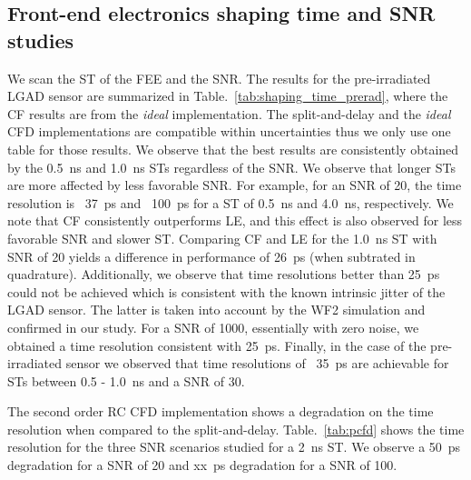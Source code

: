 \documentclass[preprint,1p]{elsarticle}
\begin{document}
\subsection{Front-end electronics shaping time and SNR studies}\label{sec:shaping_time}
We scan the ST of the FEE and the SNR. The results for the pre-irradiated LGAD sensor are summarized in Table.~\ref{tab:shaping_time_prerad},
where the CF results are from the \textit{ideal} implementation. The {\color{red} split-and-delay}
 and the \textit{ideal} CFD implementations are compatible within uncertainties thus we only use one table for those results.
 We observe that the best results are consistently obtained by the 0.5~\si{ns} and 1.0~\si{ns} STs regardless of the SNR. We observe that
 longer STs are more affected by less favorable SNR. For example, for an SNR of 20, the time resolution is ~37~\si{ps} and ~100~\si{ps} for a
ST of 0.5~\si{ns} and 4.0~\si{ns}, respectively. We note that CF consistently outperforms LE, and this effect is also observed
 for less favorable SNR and slower ST. Comparing CF and LE for the 1.0~\si{ns} ST with SNR of 20 yields a difference in performance of
 26~\si{ps} (when subtrated in quadrature). Additionally, we observe that time resolutions better than 25~\si{ps} could not be achieved which
 is consistent with the known intrinsic jitter of the LGAD sensor. The latter is taken into account by the WF2 simulation and
confirmed in our study. For a SNR of 1000, essentially with zero noise, we obtained a time resolution consistent with 25~\si{ps}.
Finally, in the case of the pre-irradiated sensor we observed that time resolutions of ~35~\si{ps} are achievable for
STs between 0.5 - 1.0~\si{ns} and a SNR of 30.

The {\color{red} second order RC} CFD implementation shows a degradation on the time resolution when compared
to the {\color{red} split-and-delay}. Table.~\ref{tab:pcfd} shows the time resolution for the three SNR scenarios
studied for a 2~\si{ns} ST. We observe a 50~\si{ps} degradation for a SNR of 20 and  xx~\si{ps} degradation for a SNR of 100.
\end{document}
